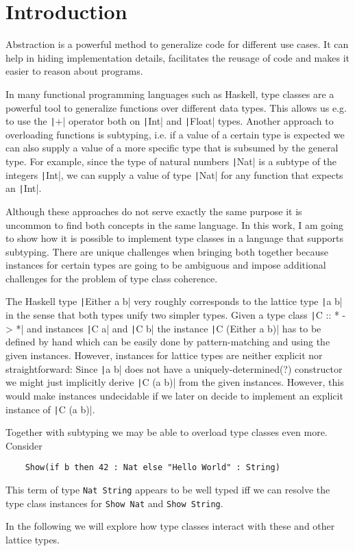 
\chapter{Introduction}\label{ch:intro}

Abstraction is a powerful method to generalize code for different use cases.
It can help in hiding implementation details, facilitates the reusage of code and makes it easier to reason about programs.

In many functional programming languages such as Haskell, type classes are a powerful tool to generalize functions over different data types.
This allows us e.g. to use the \texttt|+| operator both on \texttt|Int| and \texttt|Float| types.
Another approach to overloading functions is subtyping, i.e. if a value of a certain type is expected we can also supply a value of a more specific type that is subsumed by the general type.
For example, since the type of natural numbers \texttt|Nat| is a subtype of the integers \texttt|Int|, we can supply a value of type \texttt|Nat| for any function that expects an \texttt|Int|.

Although these approaches do not serve exactly the same purpose it is uncommon to find both concepts in the same language.
In this work, I am going to show how it is possible to implement type classes in a language that supports subtyping.
There are unique challenges when bringing both together because instances for certain types are going to be ambiguous and impose additional challenges for the problem of type class coherence.

The Haskell type \texttt|Either a b| very roughly corresponds to the lattice type \texttt|a \/ b|  in the sense that both types unify two simpler types.
Given a type class \texttt|C :: * -> *| and instances \texttt|C a| and \texttt|C b| the instance \texttt|C (Either a b)| has to be defined by hand which can be easily done by pattern-matching and using the given instances.
However, instances for lattice types are neither explicit nor straightforward:
Since \texttt|a \/ b| does not have a uniquely-determined(?) constructor we might just implicitly derive \texttt|C (a \/ b)| from the given instances.
However, this would make instances undecidable if we later on decide to implement an explicit instance of \texttt|C (a \/ b)|.

Together with subtyping we may be able to overload type classes even more.
Consider
\begin{verbatim}
    Show(if b then 42 : Nat else "Hello World" : String)
\end{verbatim}
This term of type \texttt{Nat \/ String} appears to be well typed iff we can resolve the type class instances for \texttt{Show Nat} and \texttt{Show String}.

In the following we will explore how type classes interact with these and other lattice types.
